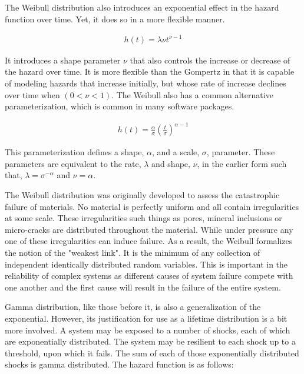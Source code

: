 The Weibull distribution also introduces an exponential effect in the hazard function over time. Yet, it does so in a more flexible manner.

\begin{align*}
 h(t) = \lambda \nu t^{\nu - 1} \tag{ $\lambda >0, \nu > 0$ }
\end{align*}

It introduces a shape parameter $\nu$ that also controls the increase or decrease of the hazard over time. It is more flexible than the Gompertz in that it is capable of modeling hazards that increase initially, but whose rate of increase declines over time when $(0 < \nu < 1)$. The Weibull also has a common alternative parameterization, which is common in many software packages.

\begin{align*}
h(t) = \frac{\alpha}{\sigma} \left (\frac{t}{\sigma}  \right )^{\alpha - 1} \tag{$\alpha > 0, \sigma > 0$}
\end{align*}

This parameterization defines a shape, $\alpha$, and a scale, $\sigma$, parameter. These parameters are equivalent to the rate, $\lambda$ and shape, $\nu$, in the earlier form such that, $\lambda = \sigma^{-\alpha}$ and $\nu = \alpha$.


The Weibull distribution was originally developed to assess the catastrophic failure of materials. No material is perfectly uniform and all contain irregularities at some scale. These irregularities such things as pores, mineral inclusions or micro-cracks are distributed throughout the material. While under pressure any one of these irregularities can induce failure. As a result, the Weibull formalizes the notion of the "weakest link"\cite{Rinne2008}. It is the minimum of any collection of independent identically distributed random variables. This is important in the reliability of complex systems as different causes of system failure compete with one another and the first cause will result in the failure of the entire system\cite{Quinn2010}.

Gamma distribution, like those before it, is also a generalization of the exponential. However, its justification for use as a lifetime distribution is a bit more involved. A system may be exposed to a number of shocks, each of which are exponentially distributed. The system may be resilient to each shock up to a threshold, upon which it fails. The sum of each of those exponentially distributed shocks is gamma distributed\cite{Tso2010}. The hazard function is as follows:

